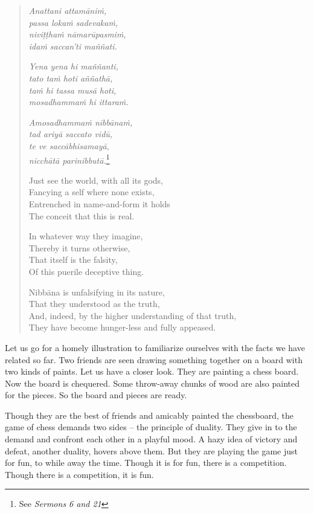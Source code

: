 \begin{quote}
\emph{Anattani attamāniṁ,}\\
\emph{passa lokaṁ sadevakaṁ,}\\
\emph{niviṭṭhaṁ nāmarūpasmiṁ,}\\
\emph{idaṁ saccan'ti maññati.}

\emph{Yena yena hi maññanti,}\\
\emph{tato taṁ hoti aññathā,}\\
\emph{taṁ hi tassa musā hoti,}\\
\emph{mosadhammaṁ hi ittaraṁ.}

\emph{Amosadhammaṁ nibbānaṁ,}\\
\emph{tad ariyā saccato vidū,}\\
\emph{te ve saccābhisamayā,}\\
\emph{nicchātā parinibbutā.}\footnote{See \emph{Sermons 6 and 21}}

Just see the world, with all its gods,\\
Fancying a self where none exists,\\
Entrenched in name-and-form it holds\\
The conceit that this is real.

In whatever way they imagine,\\
Thereby it turns otherwise,\\
That itself is the falsity,\\
Of this puerile deceptive thing.

Nibbāna is unfalsifying in its nature,\\
That they understood as the truth,\\
And, indeed, by the higher understanding of that truth,\\
They have become hunger-less and fully appeased.
\end{quote}

Let us go for a homely illustration to familiarize ourselves with the facts we have related so far. Two friends are seen drawing something together on a board with two kinds of paints. Let us have a closer look. They are painting a chess board. Now the board is chequered. Some throw-away chunks of wood are also painted for the pieces. So the board and pieces are ready.

Though they are the best of friends and amicably painted the chessboard, the game of chess demands two sides -- the principle of duality. They give in to the demand and confront each other in a playful mood. A hazy idea of victory and defeat, another duality, hovers above them. But they are playing the game just for fun, to while away the time. Though it is for fun, there is a competition. Though there is a competition, it is fun.

